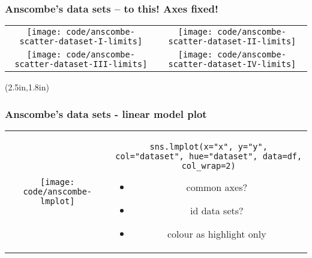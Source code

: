 \documentclass{beamer}
\newcommand{\key}[1]{\textcolor{keyred}{{\bf #1}}}
\begin{document}
\begin{frame}
\frametitle{Anscombe's data sets -- to this! Axes fixed!}
\begin{center}
\begin{tabular}{cc}
\texttt{[image: code/anscombe-scatter-dataset-I-limits]} &
\texttt{[image: code/anscombe-scatter-dataset-II-limits]} \\
\texttt{[image: code/anscombe-scatter-dataset-III-limits]} &
\texttt{[image: code/anscombe-scatter-dataset-IV-limits]} \\
\end{tabular}
\end{center}
\begin{textblock*}{3.5in}(2.5in,1.8in)
\begin{minipage}{0.75\textwidth}
\end{minipage}
\end{textblock*}
\end{frame}


\begin{frame}
\frametitle{Anscombe's data sets - linear model plot}
\begin{tabular}{@{}cc}
\begin{minipage}[c]{0.75\textwidth}
\texttt{[image: code/anscombe-lmplot]}
\end{minipage}&
\begin{minipage}[c]{0.25\textwidth}
{\scriptsize \tt sns.lmplot(x="x", y="y", col="dataset", hue="dataset", data=df, col\_wrap=2)}
\begin{itemize}
\item \pause common axes?  {\key \faThumbsUp}
\item id data sets?  {\key \faThumbsUp}
\item colour as highlight only {\key \faThumbsUp}
\end{itemize}
\end{minipage}
\end{tabular}
\end{frame}
\end{document}
